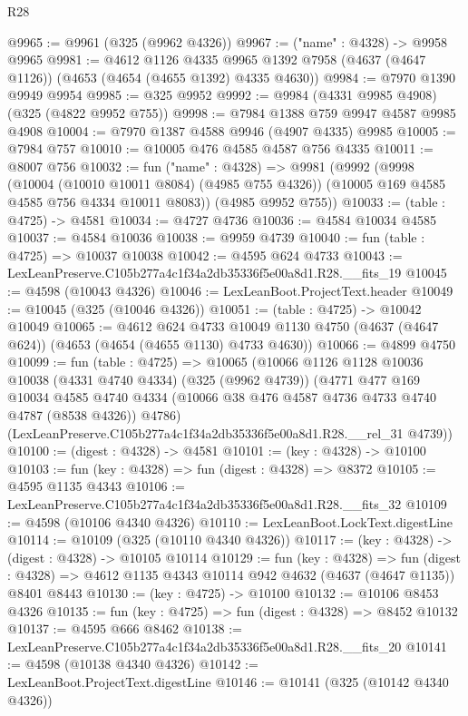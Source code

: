 \begin{lexlean}{R28}
\begin{coremodule}
@9965 := @9961 (@325 (@9962 @4326))
@9967 := ("name" : @4328) -> @9958 @9965
@9981 := @4612
    @1126
    @4335
    @9965
    @1392
    @7958
    (@4637 (@4647 @1126))
    (@4653 (@4654 (@4655 @1392) @4335 @4630))
@9984 := @7970 @1390 @9949 @9954
@9985 := @325 @9952
@9992 := @9984 (@4331 @9985 @4908) (@325 (@4822 @9952 @755))
@9998 := @7984 @1388 @759 @9947 @4587 @9985 @4908
@10004 := @7970 @1387 @4588 @9946 (@4907 @4335) @9985
@10005 := @7984 @757
@10010 := @10005 @476 @4585 @4587 @756 @4335
@10011 := @8007 @756
@10032 := fun ("name" : @4328) =>
  @9981
    (@9992
      (@9998
        (@10004 (@10010 @10011 @8084) (@4985 @755 @4326))
        (@10005 @169 @4585 @4585 @756 @4334 @10011 @8083))
      (@4985 @9952 @755))
@10033 := (table : @4725) -> @4581
@10034 := @4727 @4736
@10036 := @4584 @10034 @4585
@10037 := @4584 @10036
@10038 := @9959 @4739
@10040 := fun (table : @4725) => @10037 @10038
@10042 := @4595 @624 @4733
@10043 := LexLeanPreserve.C105b277a4c1f34a2db35336f5e00a8d1.R28.__fits_19
@10045 := @4598 (@10043 @4326)
@10046 := LexLeanBoot.ProjectText.header
@10049 := @10045 (@325 (@10046 @4326))
@10051 := (table : @4725) -> @10042 @10049
@10065 := @4612
    @624
    @4733
    @10049
    @1130
    @4750
    (@4637 (@4647 @624))
    (@4653 (@4654 (@4655 @1130) @4733 @4630))
@10066 := @4899 @4750
@10099 := fun (table : @4725) =>
  @10065
    (@10066
      @1126
      @1128
      @10036
      @10038
      (@4331 @4740 @4334)
      (@325 (@9962 @4739))
      (@4771
        @477
        @169
        @10034
        @4585
        @4740
        @4334
        (@10066 @38 @476 @4587 @4736 @4733 @4740 @4787 (@8538 @4326))
        @4786)
      (LexLeanPreserve.C105b277a4c1f34a2db35336f5e00a8d1.R28.__rel_31 @4739))
@10100 := (digest : @4328) -> @4581
@10101 := (key : @4328) -> @10100
@10103 := fun (key : @4328) => fun (digest : @4328) => @8372
@10105 := @4595 @1135 @4343
@10106 := LexLeanPreserve.C105b277a4c1f34a2db35336f5e00a8d1.R28.__fits_32
@10109 := @4598 (@10106 @4340 @4326)
@10110 := LexLeanBoot.LockText.digestLine
@10114 := @10109 (@325 (@10110 @4340 @4326))
@10117 := (key : @4328) -> (digest : @4328) -> @10105 @10114
@10129 := fun (key : @4328) =>
  fun (digest : @4328) => @4612 @1135 @4343 @10114 @942 @4632 (@4637 (@4647 @1135)) @8401 @8443
@10130 := (key : @4725) -> @10100
@10132 := @10106 @8453 @4326
@10135 := fun (key : @4725) => fun (digest : @4328) => @8452 @10132
@10137 := @4595 @666 @8462
@10138 := LexLeanPreserve.C105b277a4c1f34a2db35336f5e00a8d1.R28.__fits_20
@10141 := @4598 (@10138 @4340 @4326)
@10142 := LexLeanBoot.ProjectText.digestLine
@10146 := @10141 (@325 (@10142 @4340 @4326))

\end{coremodule}
\end{lexlean}
